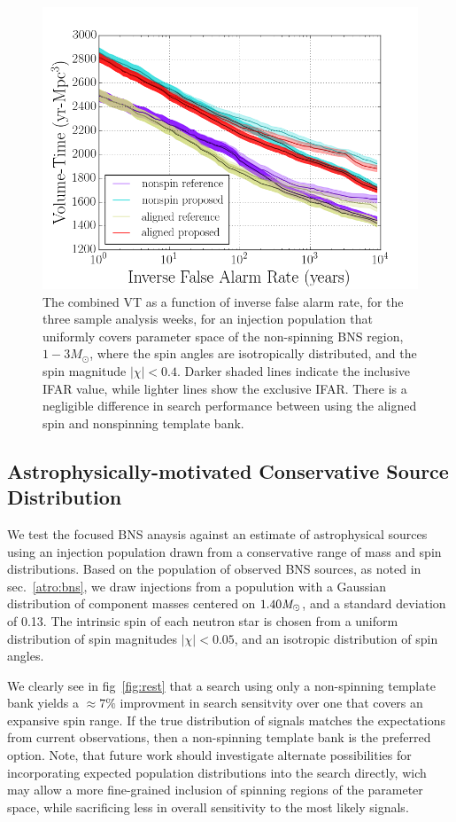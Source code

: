 \begin{figure}
\centering
\includegraphics[width=1.0\textwidth]{papers/bns_o1_dev/figures/prec_combined.png}
\caption{\label{fig:prec} 
The combined VT as a function of inverse false alarm rate, for the
three sample analysis weeks, for an injection population that uniformly covers parameter space of the non-spinning BNS region, $1- 3M_\odot$, where
the spin angles are isotropically distributed, and the spin magnitude $|\chi| < 0.4$. Darker shaded lines indicate the inclusive IFAR value, while lighter lines show the exclusive IFAR. There is a negligible difference in search performance between using the aligned spin and nonspinning template bank.
}
\end{figure}

\subsection{Astrophysically-motivated Conservative Source Distribution}

We test the focused BNS anaysis against an estimate of astrophysical sources using an injection population drawn from a conservative range of mass and spin distributions. Based on the population of observed BNS sources, as noted in sec.~\ref{atro:bns}, we draw injections from a populution with a Gaussian distribution of component masses centered on $1.40 \mathit{M}_\odot$, and a standard deviation of 0.13. The intrinsic spin of each neutron star is chosen from a uniform distribution of spin magnitudes $|\chi| < 0.05$, and an isotropic distribution of spin angles. 

We clearly see in fig~\ref{fig:rest} that a search using only a non-spinning template bank yields a $\approx{7\%}$ improvment in search sensitvity over one that covers an expansive spin range. If the true distribution of signals matches the expectations from current observations, then a non-spinning template bank is the preferred option. Note, that future work should investigate alternate possibilities for incorporating expected population distributions into the search directly, wich may allow a more fine-grained inclusion of spinning regions of the parameter space, while sacrificing less in overall sensitivity to the most likely signals.

